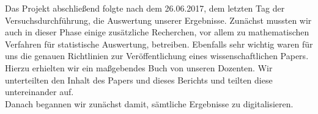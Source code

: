 \documentclass{Bericht}
\begin{document}
 
		Das Projekt abschließend folgte nach dem 26.06.2017, dem letzten Tag der Versuchsdurchführung, die Auswertung unserer Ergebnisse.
		Zunächst mussten wir auch in dieser Phase einige zusätzliche Recherchen, vor allem zu mathematischen Verfahren für statistische Auswertung, betreiben. Ebenfalls sehr wichtig waren für uns die genauen Richtlinien zur Veröffentlichung eines wissenschaftlichen Papers. Hierzu erhielten wir ein maßgebendes Buch von unseren Dozenten. Wir unterteilten den Inhalt des Papers und dieses Berichts und teilten diese untereinander auf.\\
		Danach begannen wir zunächst damit, sämtliche Ergebnisse zu digitalisieren.

\clearpage

%


\end{document}
